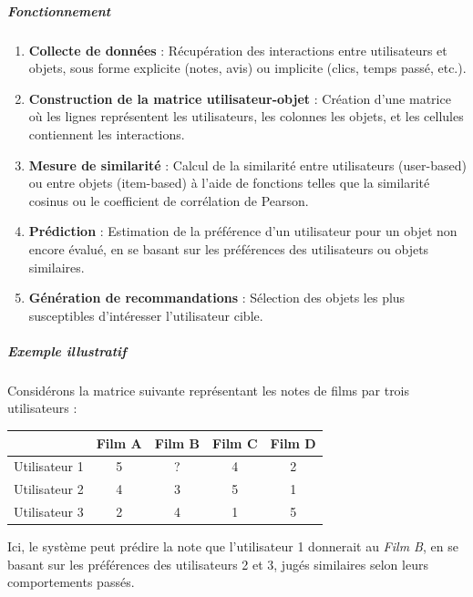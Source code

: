 \documentclass{article}
\begin{document}
\subparagraph{Fonctionnement}
\begin{enumerate}
    \item \textbf{Collecte de données} : Récupération des interactions entre utilisateurs et objets, sous forme explicite (notes, avis) ou implicite (clics, temps passé, etc.).

    \item \textbf{Construction de la matrice utilisateur-objet} : Création d’une matrice où les lignes représentent les utilisateurs, les colonnes les objets, et les cellules contiennent les interactions.

    \item \textbf{Mesure de similarité} : Calcul de la similarité entre utilisateurs (user-based) ou entre objets (item-based) à l’aide de fonctions telles que la similarité cosinus ou le coefficient de corrélation de Pearson.

    \item \textbf{Prédiction} : Estimation de la préférence d’un utilisateur pour un objet non encore évalué, en se basant sur les préférences des utilisateurs ou objets similaires.

    \item \textbf{Génération de recommandations} : Sélection des objets les plus susceptibles d’intéresser l’utilisateur cible.
\end{enumerate}

\subparagraph{Exemple illustratif}
Considérons la matrice suivante représentant les notes de films par trois utilisateurs :

\begin{center}
    \begin{tabular}{|c|c|c|c|c|}
        \hline
                      & Film A & Film B & Film C & Film D \\
        \hline
        Utilisateur 1 & 5      & ?      & 4      & 2      \\
        \hline
        Utilisateur 2 & 4      & 3      & 5      & 1      \\
        \hline
        Utilisateur 3 & 2      & 4      & 1      & 5      \\
        \hline
    \end{tabular}
\end{center}

Ici, le système peut prédire la note que l'utilisateur 1 donnerait au \textit{Film B}, en se basant sur les préférences des utilisateurs 2 et 3, jugés similaires selon leurs comportements passés.
\end{document}
